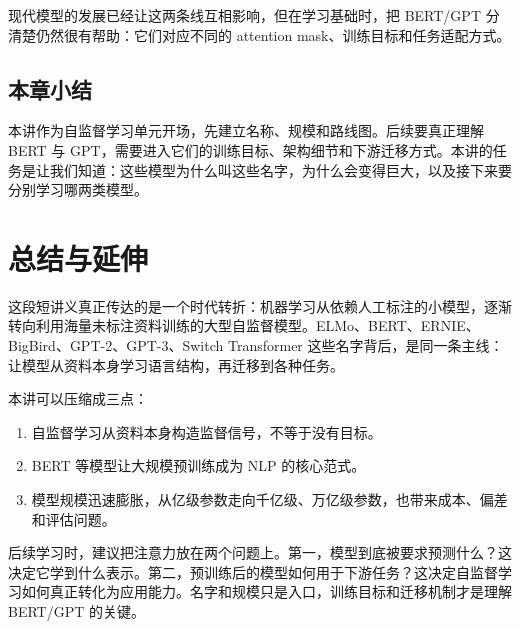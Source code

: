 \documentclass[a4paper]{article}
\begin{document}
现代模型的发展已经让这两条线互相影响，但在学习基础时，把 BERT/GPT 分清楚仍然很有帮助：它们对应不同的 attention mask、训练目标和任务适配方式。

\subsection{本章小结}

本讲作为自监督学习单元开场，先建立名称、规模和路线图。后续要真正理解 BERT 与 GPT，需要进入它们的训练目标、架构细节和下游迁移方式。本讲的任务是让我们知道：这些模型为什么叫这些名字，为什么会变得巨大，以及接下来要分别学习哪两类模型。

\section{总结与延伸}

这段短讲义真正传达的是一个时代转折：机器学习从依赖人工标注的小模型，逐渐转向利用海量未标注资料训练的大型自监督模型。ELMo、BERT、ERNIE、BigBird、GPT-2、GPT-3、Switch Transformer 这些名字背后，是同一条主线：让模型从资料本身学习语言结构，再迁移到各种任务。

本讲可以压缩成三点：

\begin{enumerate}
    \item 自监督学习从资料本身构造监督信号，不等于没有目标。
    \item BERT 等模型让大规模预训练成为 NLP 的核心范式。
    \item 模型规模迅速膨胀，从亿级参数走向千亿级、万亿级参数，也带来成本、偏差和评估问题。
\end{enumerate}

后续学习时，建议把注意力放在两个问题上。第一，模型到底被要求预测什么？这决定它学到什么表示。第二，预训练后的模型如何用于下游任务？这决定自监督学习如何真正转化为应用能力。名字和规模只是入口，训练目标和迁移机制才是理解 BERT/GPT 的关键。
\end{document}
